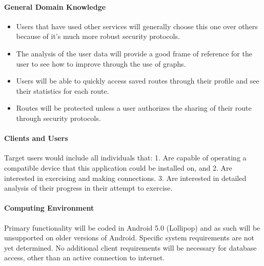 ﻿\documentclass{article}
\begin{document}
\paragraph{General Domain Knowledge}
\begin{itemize}
    \item Users that have used other services will generally choose this one over others because of it’s much more robust security protocols.
    \item The analysis of the user data will provide a good frame of reference for the user to see how to improve through the use of graphs.
    \item Users will be able to quickly access saved routes through their profile and see their statistics for each route.
    \item Routes will be protected unless a user authorizes the sharing of their route through security protocols.
\end{itemize}

\paragraph{Clients and Users}
Target users would include all individuals that: 1. Are capable of operating a compatible device that this application could be installed on, and 2. Are interested in exercising and making connections. 3. Are interested in detailed analysis of their progress in their attempt to exercise.

\paragraph{Computing Environment}
Primary functionality will be coded in Android 5.0 (Lollipop) and as such will be unsupported on older versions of Android. Specific system requirements are not yet determined. No additional client requirements will be necessary for database access, other than an active connection to internet.
\end{document}
